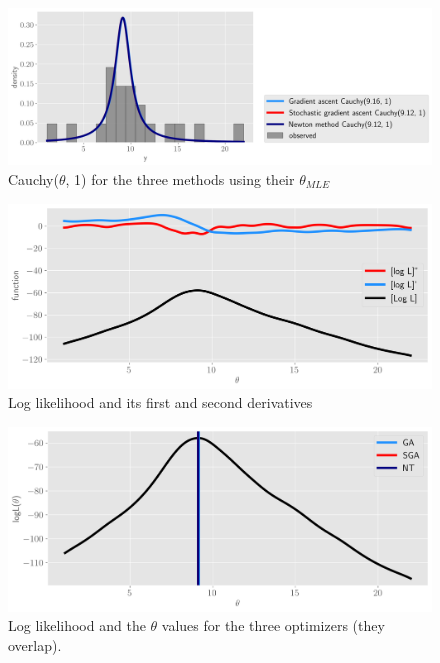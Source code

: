 \documentclass[11pt]{article}
\begin{document}
\begin{figure}[!h]
    \centering
    \includegraphics[scale=.55]{homework_2/figures/mle_cauchy.png}
    \caption{Cauchy($\theta$, 1) for the three methods using their $\theta_{MLE}$}
    \label{fig:my_label}
\end{figure}

\begin{figure}[!h]
    \centering
    \includegraphics[scale=.55]{homework_2/figures/cauchy_fns.png}
    \caption{Log likelihood and its first and second derivatives}
    \label{fig:my_label}
\end{figure}

\begin{figure}[!h]
    \centering
    \includegraphics[scale=.55]{homework_2/figures/cauchy_loglike.png}
    \caption{Log likelihood and the $\theta$ values for the three optimizers (they overlap).}
    \label{fig:my_label}
\end{figure}
\end{document}

